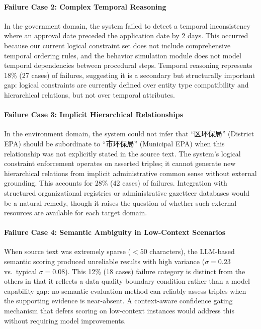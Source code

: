 \documentclass[runningheads]{llncs}
\begin{document}
\paragraph{Failure Case 2: Complex Temporal Reasoning}
In the government domain, the system failed to detect a temporal inconsistency where an approval date preceded the application date by 2 days. This occurred because our current logical constraint set does not include comprehensive temporal ordering rules, and the behavior simulation module does not model temporal dependencies between procedural steps. Temporal reasoning represents 18\% (27 cases) of failures, suggesting it is a secondary but structurally important gap: logical constraints are currently defined over entity type compatibility and hierarchical relations, but not over temporal attributes.

\paragraph{Failure Case 3: Implicit Hierarchical Relationships}
In the environment domain, the system could not infer that ``区环保局'' (District EPA) should be subordinate to ``市环保局'' (Municipal EPA) when this relationship was not explicitly stated in the source text. The system's logical constraint enforcement operates on asserted triples; it cannot generate new hierarchical relations from implicit administrative common sense without external grounding. This accounts for 28\% (42 cases) of failures. Integration with structured organizational registries or administrative gazetteer databases would be a natural remedy, though it raises the question of whether such external resources are available for each target domain.

\paragraph{Failure Case 4: Semantic Ambiguity in Low-Context Scenarios}
When source text was extremely sparse ($< 50$ characters), the LLM-based semantic scoring produced unreliable results with high variance ($\sigma = 0.23$ vs.\ typical $\sigma = 0.08$). This 12\% (18 cases) failure category is distinct from the others in that it reflects a data quality boundary condition rather than a model capability gap: no semantic evaluation method can reliably assess triples when the supporting evidence is near-absent. A context-aware confidence gating mechanism that defers scoring on low-context instances would address this without requiring model improvements.
\end{document}

